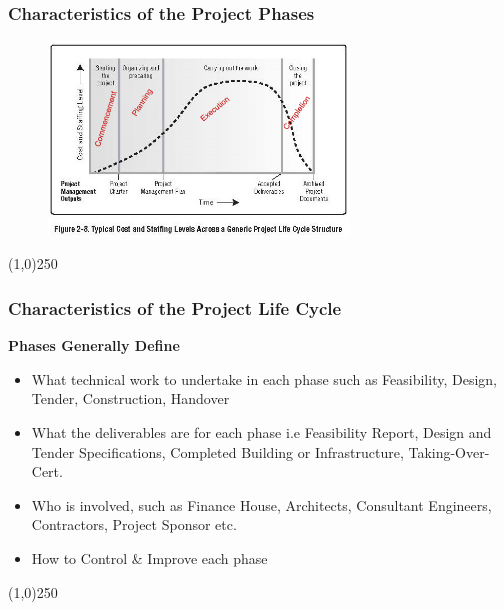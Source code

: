 \begin{frame}
\frametitle{Characteristics of the Project Phases}
 \begin{figure}
 	\centering
 		\includegraphics[width = 8cm]{images/Fig2-8edit.jpg}
 	\label{fig:2-8edit}
 \end{figure}
\end{frame}
\begin{center}\line(1,0){250}\end{center}



\begin{frame}
\frametitle{Characteristics of the Project Life Cycle}
\textbf{Phases Generally Define}\\
\begin{itemize}
	\item What technical work to undertake in each phase such as Feasibility, Design, Tender, Construction, Handover
	\item What the deliverables are for each phase i.e Feasibility Report, Design and Tender Specifications, Completed Building or Infrastructure, Taking-Over-Cert.
	\item Who is involved, such as Finance House, Architects, Consultant Engineers, Contractors, Project Sponsor etc.
	\item How to Control \& Improve each phase
\end{itemize}
\end{frame}
\begin{center}\line(1,0){250}\end{center}




